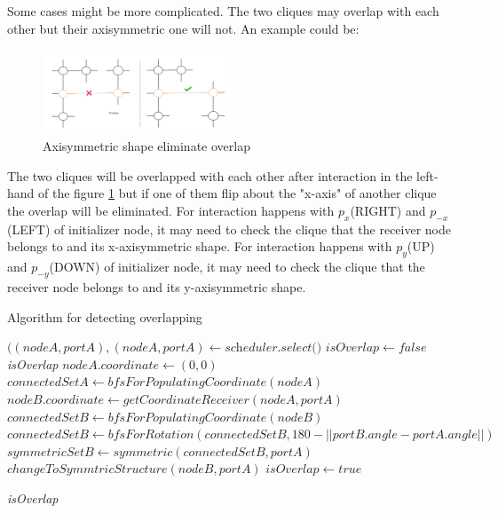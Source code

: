 \par\noindent
Some cases might be more complicated. The two cliques may overlap with each other but their axisymmetric one will not. An example could be:
\begin{figure}[H]
\begin{center}
\includegraphics[width = 0.5\textwidth]{context/diagram/overlap_flipping.pdf}
\caption{Axisymmetric shape eliminate overlap}
\label{overlap_flipping}
\end{center}
\end{figure}
\par\noindent
The two cliques will be overlapped with each other after interaction in the left-hand of the figure \ref{overlap_flipping} but if one of them
flip about the "x-axis" of another clique the overlap will be eliminated. For interaction happens with $p_{x}$(RIGHT) and $p_{-x}$(LEFT) of initializer node, it may need to check the
clique that the receiver node belongs to and its x-axisymmetric shape. For interaction happens with $p_{y}$(UP) and $p_{-y}$(DOWN) of initializer node, it may need to check the
clique that the receiver node belongs to and its y-axisymmetric shape.

\begin{algorithm}
\caption{Algorithm for detecting overlapping}\label{algo_do}
\begin{algorithmic}[1]

\State $((\textit{nodeA},\textit{portA}), (\textit{nodeA}, \textit{portA}) \gets \textit{scheduler.select()}$
\State $\textit{isOverlap} \gets false$
 \Return \textit{isOverlap}
\Else
    \State $ nodeA.coordinate \gets (0,0) $
    \State $ connectedSetA \gets bfsForPopulatingCoordinate(nodeA) $
    \State $ nodeB.coordinate \gets getCoordinateReceiver(nodeA, portA)$
    \State $ connectedSetB \gets bfsForPopulatingCoordinate(nodeB) $
    \State $ connectedSetB \gets bfsForRotation(connectedSetB, 180 - ||portB.angle - portA.angle||) $
    \State $ symmetricSetB \gets symmetric(connectedSetB, portA)$
        \State $changeToSymmtricStructure(nodeB, portA)$
      \EndIf
      \State $\textit{isOverlap} \gets true$
    \EndIf
\EndIf

\Return \textit{isOverlap}

\EndProcedure
\end{algorithmic}
\end{algorithm}



